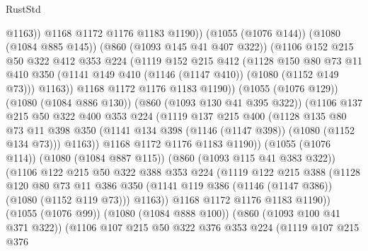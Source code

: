 \begin{lexlean}{RustStd}
\begin{coremodule}
                      @1163))
                  @1168
                  @1172
                  @1176
                  @1183
                  @1190))
              (@1055 (@1076 @144))
              (@1080 (@1084 @885 @145))
              (@860 (@1093 @145 @41 @407 @322))
              (@1106
                @152
                @215
                @50
                @322
                @412
                @353
                @224
                (@1119
                  @152
                  @215
                  @412
                  (@1128
                    @150
                    @80
                    @73
                    @11
                    @410
                    @350
                    (@1141 @149 @410 (@1146 (@1147 @410)) (@1080 (@1152 @149 @73)))
                    @1163))
                @1168
                @1172
                @1176
                @1183
                @1190))
            (@1055 (@1076 @129))
            (@1080 (@1084 @886 @130))
            (@860 (@1093 @130 @41 @395 @322))
            (@1106
              @137
              @215
              @50
              @322
              @400
              @353
              @224
              (@1119
                @137
                @215
                @400
                (@1128
                  @135
                  @80
                  @73
                  @11
                  @398
                  @350
                  (@1141 @134 @398 (@1146 (@1147 @398)) (@1080 (@1152 @134 @73)))
                  @1163))
              @1168
              @1172
              @1176
              @1183
              @1190))
          (@1055 (@1076 @114))
          (@1080 (@1084 @887 @115))
          (@860 (@1093 @115 @41 @383 @322))
          (@1106
            @122
            @215
            @50
            @322
            @388
            @353
            @224
            (@1119
              @122
              @215
              @388
              (@1128
                @120
                @80
                @73
                @11
                @386
                @350
                (@1141 @119 @386 (@1146 (@1147 @386)) (@1080 (@1152 @119 @73)))
                @1163))
            @1168
            @1172
            @1176
            @1183
            @1190))
        (@1055 (@1076 @99))
        (@1080 (@1084 @888 @100))
        (@860 (@1093 @100 @41 @371 @322))
        (@1106
          @107
          @215
          @50
          @322
          @376
          @353
          @224
          (@1119
            @107
            @215
            @376

\end{coremodule}
\end{lexlean}
